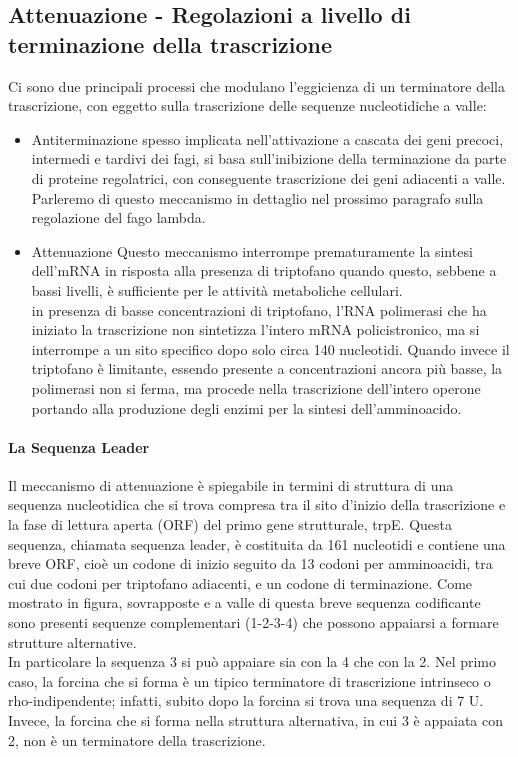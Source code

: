 \documentclass{article}
\begin{document}
\subsection{Attenuazione - Regolazioni a livello di terminazione della trascrizione}
Ci sono due principali processi che modulano l'eggicienza di un terminatore della trascrizione, con eggetto sulla trascrizione delle sequenze nucleotidiche a valle:
\begin{itemize}
    \item Antiterminazione
        \subitem spesso implicata nell'attivazione a cascata dei geni
        precoci, intermedi e tardivi dei fagi, si basa sull'inibizione della terminazione da
        parte di proteine regolatrici, con conseguente trascrizione dei geni adiacenti a
        valle. Parleremo di questo meccanismo in dettaglio nel prossimo paragrafo sulla
        regolazione del fago lambda.
    \item Attenuazione
        \subitem  Questo meccanismo interrompe prematuramente la sintesi dell'mRNA in risposta alla presenza di triptofano quando questo, sebbene a
        bassi livelli, è sufficiente per le attività metaboliche cellulari.\\
        in presenza di basse concentrazioni di triptofano, l'RNA polimerasi che ha iniziato la trascrizione non sintetizza l'intero mRNA policistronico, ma si interrompe
        a un sito specifico dopo solo circa 140 nucleotidi. Quando invece il triptofano è
        limitante, essendo presente a concentrazioni ancora più basse, la polimerasi non
        si ferma, ma procede nella trascrizione dell'intero operone portando alla produzione degli enzimi per la sintesi dell'amminoacido.
\end{itemize}
\paragraph{La Sequenza Leader}
Il meccanismo di attenuazione è spiegabile in termini di struttura di
una sequenza nucleotidica che si trova compresa tra il sito d'inizio della trascrizione e la fase di lettura aperta (ORF) del primo gene strutturale, trpE. Questa
sequenza, chiamata sequenza leader, è costituita da 161 nucleotidi e contiene una breve ORF, cioè un codone di
inizio seguito da 13 codoni per amminoacidi, tra cui due codoni per triptofano
adiacenti, e un codone di terminazione. Come mostrato in figura, sovrapposte
e a valle di questa breve sequenza codificante sono presenti sequenze complementari (1-2-3-4) che possono appaiarsi a formare strutture alternative.\\
In particolare la sequenza 3 si può appaiare sia con la 4 che con la 2. 
Nel primo caso, la forcina che si forma è un tipico
terminatore di trascrizione intrinseco o rho-indipendente; infatti, subito dopo
la forcina si trova una sequenza di 7 U.\\        
Invece, la forcina che si
forma nella struttura alternativa, in cui 3 è appaiata con 2, non è un terminatore
della trascrizione.
\end{document}
